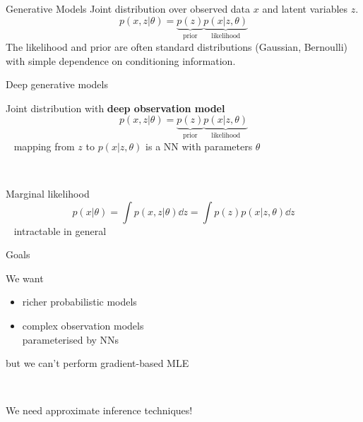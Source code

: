 

\begin{frame}{Generative Models}
Joint distribution over observed data $ x $ and latent variables $ z $.
\begin{equation*}
p(x,z|\theta) =  \underbrace{p(z)}_{\text{prior}} \underbrace{p(x|z,\theta)}_{\text{likelihood}}
\end{equation*} 
The likelihood and prior are often standard distributions (Gaussian, Bernoulli) with simple dependence on conditioning
information.
\end{frame}

\begin{frame}{Deep generative models}

Joint distribution with {\bf deep observation model}
\begin{equation*}
p(x, z|\theta) = \underbrace{p(z)}_{\text{prior}} \underbrace{p(x|z, \theta)}_{\text{likelihood}}
\end{equation*}
~ {\small mapping from $z$ to $p(x|z, \theta)$ is a NN with parameters $\theta$}

~ \pause

Marginal likelihood 
\begin{equation*}
p(x|\theta) = \int p(x, z|\theta) \dd{z} = \int p(z)p(x|z, \theta) \dd{z} 
\end{equation*}
~ \alert{intractable} in general



\end{frame}


\begin{frame}{Goals}


We want
\begin{itemize}
	\item richer probabilistic models  \pause
	\item complex observation models \\
	parameterised by NNs 
\end{itemize}
\pause
but we can't perform gradient-based MLE

~

\pause

We need \alert{approximate inference} techniques!

\end{frame}


